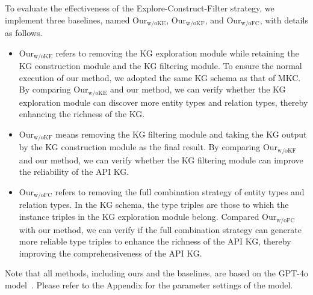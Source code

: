 To evaluate the effectiveness of the Explore-Construct-Filter strategy, we implement three baselines, named Our$_{\text{w/oKE}}$, Our$_{\text{w/oKF}}$, and Our$_{\text{w/oFC}}$, with details as follows.

\begin{itemize}[leftmargin=*]
    \item Our$_{\text{w/oKE}}$ refers to removing the KG exploration module while retaining the KG construction module and the KG filtering module. 
    To ensure the normal execution of our method, we adopted the same KG schema as that of MKC.
    By comparing Our$_{\text{w/oKE}}$ and our method, we can verify whether the KG exploration module can discover more entity types and relation types, thereby enhancing the richness of the KG.
    \item Our$_{\text{w/oKF}}$ means removing the KG filtering module and taking the KG output by the KG construction module as the final result.
    By comparing Our$_{\text{w/oKF}}$ and our method, we can verify whether the KG filtering module can improve the reliability of the API KG.
    \item  Our$_{\text{w/oFC}}$ refers to removing the full combination strategy of entity types and relation types.
    In the KG schema, the type triples are those to which the instance triples in the KG exploration module belong. 
    Compared Our$_{\text{w/oFC}}$ with our method, we can verify if the full combination strategy can generate more reliable type triples to enhance the richness of the API KG, thereby improving the comprehensiveness of the API KG.
\end{itemize}

Note that all methods, including ours and the baselines, are based on the GPT-4o model~\cite{basellm}.
Please refer to the Appendix for the parameter settings of the model.

